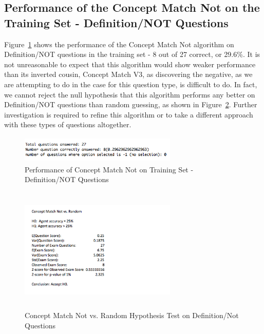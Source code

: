 \subsection{Performance of the Concept Match Not on the Training Set - Definition/NOT Questions}

Figure~\ref{fig:concept_match_not_training_set_performance} shows the performance of the Concept Match Not algorithm on Definition/NOT questions in the training set - 8 out of 27 correct, or 29.6\%.  It is not unreasonable to expect that this algorithm would show weaker performance than its inverted cousin, Concept Match V3, as discovering the negative, as we are attempting to do in the case for this question type, is difficult to do.  In fact, we cannot reject the null hypothesis that this algorithm performs any better on Definition/NOT questions than random guessing, as shown in Figure~\ref{fig:concept_match_not_hypothesis_test}.  Further investigation is required to refine this algorithm or to take a different approach with these types of questions altogether.



\begin{figure}
\centering
\vspace{0.75in}
\includegraphics[width=75mm, height=13mm]{concept_match_not_training_set_performance.png}
\caption{Performance of Concept Match Not on Training Set - Definition/NOT Questions}
\label{fig:concept_match_not_training_set_performance}
\end{figure}

\begin{figure}
\centering
\vspace{0.75in}
\includegraphics[width=75mm, height=60mm]{concept_match_not_hypothesis_test.png}
\caption{Concept Match Not vs. Random Hypothesis Test on Definition/Not Questions}
\label{fig:concept_match_not_hypothesis_test}
\end{figure}




